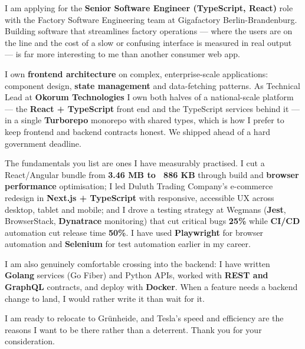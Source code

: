 \documentclass[11pt,a4paper]{awesome-cv}
\begin{document}
\makecvheader[R]
\makelettertitle

\begin{cvletter}

I am applying for the \textbf{Senior Software Engineer (TypeScript, React)} role with the Factory Software Engineering team at Gigafactory Berlin-Brandenburg. Building software that streamlines factory operations --- where the users are on the line and the cost of a slow or confusing interface is measured in real output --- is far more interesting to me than another consumer web app.

I own \textbf{frontend architecture} on complex, enterprise-scale applications: component design, \textbf{state management} and data-fetching patterns. As Technical Lead at \textbf{Okorum Technologies} I own both halves of a national-scale platform --- the \textbf{React + TypeScript} front end and the TypeScript services behind it --- in a single \textbf{Turborepo} monorepo with shared types, which is how I prefer to keep frontend and backend contracts honest. We shipped ahead of a hard government deadline.

The fundamentals you list are ones I have measurably practised. I cut a React/Angular bundle from \textbf{3.46 MB to ~886 KB} through build and \textbf{browser performance} optimisation; I led Duluth Trading Company's e-commerce redesign in \textbf{Next.js + TypeScript} with responsive, accessible UX across desktop, tablet and mobile; and I drove a testing strategy at Wegmans (\textbf{Jest}, BrowserStack, \textbf{Dynatrace} monitoring) that cut critical bugs \textbf{25\%} while \textbf{CI/CD} automation cut release time \textbf{50\%}. I have used \textbf{Playwright} for browser automation and \textbf{Selenium} for test automation earlier in my career.

I am also genuinely comfortable crossing into the backend: I have written \textbf{Golang} services (Go Fiber) and Python APIs, worked with \textbf{REST and GraphQL} contracts, and deploy with \textbf{Docker}. When a feature needs a backend change to land, I would rather write it than wait for it.

I am ready to relocate to Grünheide, and Tesla's speed and efficiency are the reasons I want to be there rather than a deterrent. Thank you for your consideration.



\end{cvletter}
\end{document}
